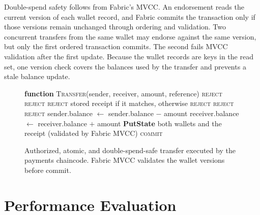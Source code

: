 \documentclass[conference]{IEEEtran}
\begin{document}
Double-spend safety follows from Fabric's MVCC. An endorsement reads the current
version of each wallet record, and Fabric commits the transaction only if those
versions remain unchanged through ordering and validation. Two concurrent transfers
from the same wallet may endorse against the same version, but only the first
ordered transaction commits. The second fails MVCC validation after the first
update. Because the wallet records are keys in the read set, one version check
covers the balances used by the transfer and prevents a stale balance update.

\begin{figure}[!t]
\centering
\begin{algorithmic}[1]
\STATE \textbf{function} \textsc{Transfer}(sender, receiver, amount, reference)
\RETURN \textsc{reject}
\ENDIF
{}
\RETURN \textsc{reject}
\ENDIF
{}
\RETURN \textsc{reject}
\ENDIF
{}
\RETURN stored receipt if it matches, otherwise \textsc{reject}
\ENDIF
{}
\RETURN \textsc{reject}
\ENDIF
{}
\RETURN \textsc{reject}
\ENDIF
\STATE sender.balance $\leftarrow$ sender.balance $-$ amount
\STATE receiver.balance $\leftarrow$ receiver.balance $+$ amount
\STATE \textbf{PutState} both wallets and the receipt (validated by Fabric MVCC)
\RETURN \textsc{commit}
\end{algorithmic}
\caption{Authorized, atomic, and double-spend-safe transfer executed by the payments
chaincode. Fabric MVCC validates the wallet versions before commit.}
\label{alg:transfer}
\end{figure}

\section{Performance Evaluation}
\label{sec:eval}
\end{document}
